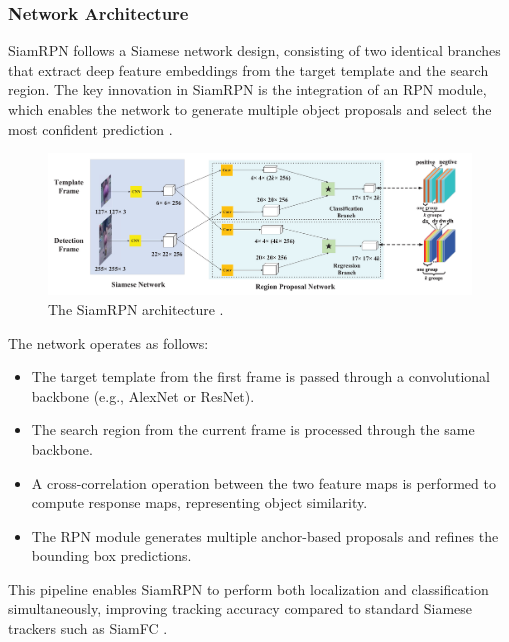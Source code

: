 \subsubsection{Network Architecture}
SiamRPN follows a Siamese network design, consisting of two identical branches that extract deep feature embeddings from the target template and the search region. The key innovation in SiamRPN is the integration of an RPN module, which enables the network to generate multiple object proposals and select the most confident prediction \cite{li2018high}.

\begin{figure}[ht]
    \centering
    \includegraphics[width=1\linewidth]{images/SiamRPN-architechture.png}
    \caption{The SiamRPN architecture \cite{li2018high}.}
    \label{fig:siamrpn_architecture}
\end{figure}

The network operates as follows:
\begin{itemize}
\item The target template from the first frame is passed through a convolutional backbone (e.g., AlexNet or ResNet).
\item The search region from the current frame is processed through the same backbone.
\item A cross-correlation operation between the two feature maps is performed to compute response maps, representing object similarity.
\item The RPN module generates multiple anchor-based proposals and refines the bounding box predictions.
\end{itemize}
This pipeline enables SiamRPN to perform both localization and classification simultaneously, improving tracking accuracy compared to standard Siamese trackers such as SiamFC \cite{bertinetto2016fully}.

